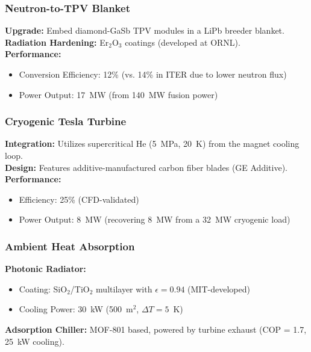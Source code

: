 \documentclass[12pt]{article}
\begin{document}
\subsubsection{Neutron-to-TPV Blanket}
\textbf{Upgrade:} Embed diamond-GaSb TPV modules in a LiPb breeder blanket. \\
\textbf{Radiation Hardening:} Er$_2$O$_3$ coatings (developed at ORNL). \\
\textbf{Performance:}
\begin{itemize}
    \item Conversion Efficiency: 12\% (vs. 14\% in ITER due to lower neutron flux)
    \item Power Output: 17~MW (from 140~MW fusion power)
\end{itemize}

\subsubsection{Cryogenic Tesla Turbine}
\textbf{Integration:} Utilizes supercritical He (5~MPa, 20~K) from the magnet cooling loop. \\
\textbf{Design:} Features additive-manufactured carbon fiber blades (GE Additive). \\
\textbf{Performance:}
\begin{itemize}
    \item Efficiency: 25\% (CFD-validated)
    \item Power Output: 8~MW (recovering 8~MW from a 32~MW cryogenic load)
\end{itemize}

\subsubsection{Ambient Heat Absorption}
\textbf{Photonic Radiator:}
\begin{itemize}
    \item Coating: SiO$_2$/TiO$_2$ multilayer with $\epsilon = 0.94$ (MIT-developed)
    \item Cooling Power: 30~kW (500~m$^2$, $\Delta T = 5$~K)
\end{itemize}
\textbf{Adsorption Chiller:} MOF-801 based, powered by turbine exhaust (COP = 1.7, 25~kW cooling).
\end{document}
